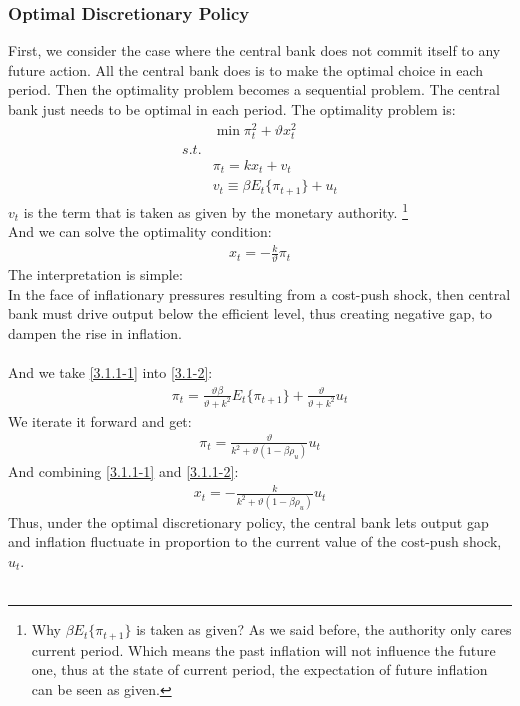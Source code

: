 \documentclass{article}
\numberwithin{equation}{section}
\begin{document}
\subsubsection{Optimal Discretionary Policy}
First, we consider the case where the central bank does not commit itself to any future action. All the central bank does is to make the optimal choice in each period. Then the optimality problem becomes a sequential problem. The central bank just needs to be optimal in each period. The optimality problem is:
	\begin{align*}
		&\min \pi^2_t + \vartheta x^2_t\\
		s.t.&\\
		&\pi_t = k x_t + v_t\\
		&v_t \equiv \beta E_t\{ \pi_{t+1} \} + u_t 
	\end{align*}
$v_t$ is the term that is taken as given by the monetary authority.
\footnote{Why $\beta E_t\{ \pi_{t+1} \}$ is taken as given? As we said before, the authority only cares current period. Which means the past inflation will not influence the future one, thus at the state of current period, the expectation of future inflation can be seen as given.}\\
And we can solve the optimality condition:
	\begin{align}
		x_t = -\frac{k}{\vartheta}\pi_t \label{3.1.1-1}
	\end{align}
The interpretation is simple:\\
In the face of inflationary pressures resulting from a cost-push shock, then central bank must drive output below the efficient level, thus creating negative gap, to dampen the rise in inflation.\\\\
And we take \eqref{3.1.1-1} into \eqref{3.1-2}:
	\begin{align*}
		\pi_t = \frac{\vartheta\beta}{\vartheta + k^2} E_t\{ \pi_{t+1} \} + \frac{\vartheta}{\vartheta + k^2}u_t 
	\end{align*} 
We iterate it forward and get:
	\begin{align}
		\pi_t = \frac{\vartheta}{k^2 + \vartheta(1 - \beta\rho_u)}u_t \label{3.1.1-2}
	\end{align}
And combining \eqref{3.1.1-1} and \eqref{3.1.1-2}:
	\begin{align}
		x_t = -\frac{k}{k^2 + \vartheta(1 - \beta\rho_u)}u_t \label{3.1.1-3} 
	\end{align}
Thus, under the optimal discretionary policy, the central bank lets output gap and inflation fluctuate in proportion to the current value of the cost-push shock, $u_t$.\\\\
\end{document}
